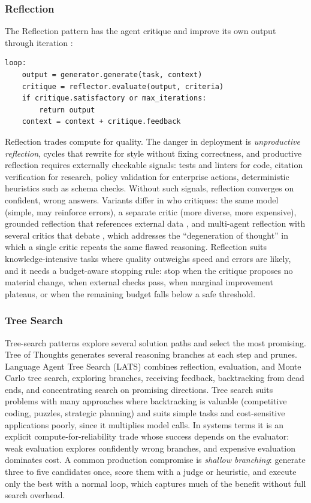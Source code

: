 \documentclass[11pt]{book}
\begin{document}
\subsubsection{Reflection}

The Reflection pattern has the agent critique and improve its own output through iteration \cite{reflexion2023}:

{\footnotesize
\begin{verbatim}
loop:
    output = generator.generate(task, context)
    critique = reflector.evaluate(output, criteria)
    if critique.satisfactory or max_iterations:
        return output
    context = context + critique.feedback
\end{verbatim}
}

Reflection trades compute for quality. The danger in deployment is \textit{unproductive reflection}, cycles that rewrite for style without fixing correctness, and productive reflection requires externally checkable signals: tests and linters for code, citation verification for research, policy validation for enterprise actions, deterministic heuristics such as schema checks. Without such signals, reflection converges on confident, wrong answers. Variants differ in who critiques: the same model (simple, may reinforce errors), a separate critic (more diverse, more expensive), grounded reflection that references external data \cite{reflexion2023}, and multi-agent reflection with several critics that debate \cite{mar2025}, which addresses the ``degeneration of thought'' in which a single critic repeats the same flawed reasoning. Reflection suits knowledge-intensive tasks where quality outweighs speed and errors are likely, and it needs a budget-aware stopping rule: stop when the critique proposes no material change, when external checks pass, when marginal improvement plateaus, or when the remaining budget falls below a safe threshold.

\subsubsection{Tree Search}

Tree-search patterns explore several solution paths and select the most promising. Tree of Thoughts generates several reasoning branches at each step and prunes. Language Agent Tree Search (LATS) \cite{lats2023} combines reflection, evaluation, and Monte Carlo tree search, exploring branches, receiving feedback, backtracking from dead ends, and concentrating search on promising directions. Tree search suits problems with many approaches where backtracking is valuable (competitive coding, puzzles, strategic planning) and suits simple tasks and cost-sensitive applications poorly, since it multiplies model calls. In systems terms it is an explicit compute-for-reliability trade whose success depends on the evaluator: weak evaluation explores confidently wrong branches, and expensive evaluation dominates cost. A common production compromise is \textit{shallow branching}: generate three to five candidates once, score them with a judge or heuristic, and execute only the best with a normal loop, which captures much of the benefit without full search overhead.
\end{document}
